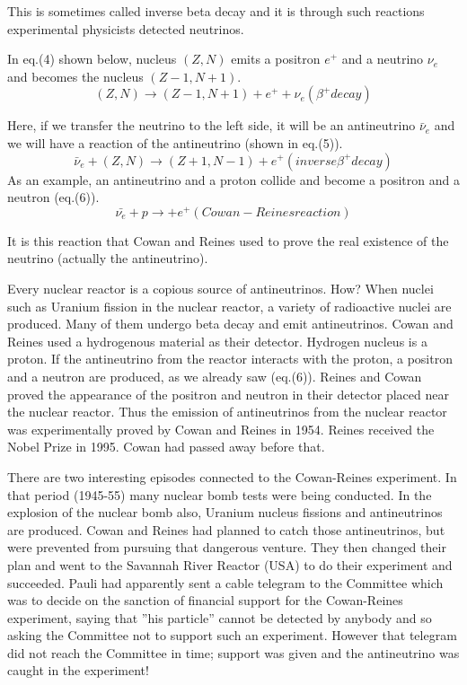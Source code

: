 This is sometimes called inverse beta decay and it is through such reactions
experimental physicists detected neutrinos.

In eq.(4) shown below, nucleus $(Z,N)$ emits a positron $e^{+}$ and a neutrino
$\nu_{e}$ and becomes the nucleus $(Z-1, N+1)$.
\begin{equation}
(Z, N) \rightarrow (Z-1, N+1) + e^{+} + \nu_{e} (\beta^{+} decay)
\end{equation}

Here, if we transfer the neutrino to the left side, it will be an antineutrino $\bar{\nu}_{e}$
and we will have a reaction of the antineutrino (shown in eq.(5)).
\begin{equation}
\bar{\nu}_{e} + (Z, N) \rightarrow (Z + 1, N-1) + e^{+} (inverse \beta^{+} decay)
\end{equation}
As an example, an antineutrino and a proton collide and become a positron
and a neutron (eq.(6)).
\begin{equation}
\bar{\nu_{e}} + p \rightarrow + e^{+} (Cowan - Reines reaction)
\end{equation}

It is this reaction that Cowan and Reines used to prove the real existence of
the neutrino (actually the antineutrino).

Every nuclear reactor is a copious source of antineutrinos. How? When
nuclei such as Uranium fission in the nuclear reactor, a variety of radioactive
nuclei are produced. Many of them undergo beta decay and emit antineutrinos. Cowan and Reines used a hydrogenous material as their detector.
Hydrogen nucleus is a proton. If the antineutrino from the reactor interacts
with the proton, a positron and a neutron are produced, as we already saw
(eq.(6)). Reines and Cowan proved the appearance of the positron and neutron in their detector placed near the nuclear reactor. Thus the emission of
antineutrinos from the nuclear reactor was experimentally proved by Cowan
and Reines in 1954. Reines received the Nobel Prize in 1995. Cowan had
passed away before that.

There are two interesting episodes connected to the Cowan-Reines experiment. In that period (1945-55) many nuclear bomb tests were being
conducted. In the explosion of the nuclear bomb also, Uranium nucleus fissions and antineutrinos are produced. Cowan and Reines had planned to
catch those antineutrinos, but were prevented from pursuing that dangerous
venture. They then changed their plan and went to the Savannah River Reactor (USA) to do their experiment and succeeded. Pauli had apparently
sent a cable telegram to the Committee which was to decide on the sanction of financial support for the Cowan-Reines experiment, saying that ”his
particle” cannot be detected by anybody and so asking the Committee not
to support such an experiment. However that telegram did not reach the
Committee in time; support was given and the antineutrino was caught in
the experiment!

